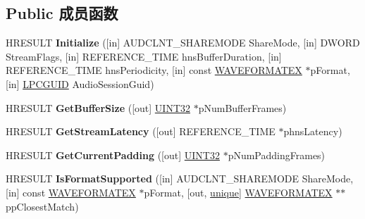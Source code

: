 \subsection*{Public 成员函数}
\begin{DoxyCompactItemize}
\item 
\mbox{\label{interface_i_audio_client_afee0701a49a99e43259a7661e1c5ed38}} 
H\+R\+E\+S\+U\+LT {\bfseries Initialize} (\mbox{[}in\mbox{]} A\+U\+D\+C\+L\+N\+T\+\_\+\+S\+H\+A\+R\+E\+M\+O\+DE Share\+Mode, \mbox{[}in\mbox{]} D\+W\+O\+RD Stream\+Flags, \mbox{[}in\mbox{]} R\+E\+F\+E\+R\+E\+N\+C\+E\+\_\+\+T\+I\+ME hns\+Buffer\+Duration, \mbox{[}in\mbox{]} R\+E\+F\+E\+R\+E\+N\+C\+E\+\_\+\+T\+I\+ME hns\+Periodicity, \mbox{[}in\mbox{]} const \hyperlink{struct_w_a_v_e_f_o_r_m_a_t_e_x}{W\+A\+V\+E\+F\+O\+R\+M\+A\+T\+EX} $\ast$p\+Format, \mbox{[}in\mbox{]} \hyperlink{interface_g_u_i_d}{L\+P\+C\+G\+U\+ID} Audio\+Session\+Guid)
\item 
\mbox{\label{interface_i_audio_client_a4e9563d4426770670c29fceba13abcea}} 
H\+R\+E\+S\+U\+LT {\bfseries Get\+Buffer\+Size} (\mbox{[}out\mbox{]} \hyperlink{_processor_bind_8h_ae1e6edbbc26d6fbc71a90190d0266018}{U\+I\+N\+T32} $\ast$p\+Num\+Buffer\+Frames)
\item 
\mbox{\label{interface_i_audio_client_a3cd4db025d640b7bc41a362745fb60c2}} 
H\+R\+E\+S\+U\+LT {\bfseries Get\+Stream\+Latency} (\mbox{[}out\mbox{]} R\+E\+F\+E\+R\+E\+N\+C\+E\+\_\+\+T\+I\+ME $\ast$phns\+Latency)
\item 
\mbox{\label{interface_i_audio_client_a130df1eee9f244b76875921bd802fa43}} 
H\+R\+E\+S\+U\+LT {\bfseries Get\+Current\+Padding} (\mbox{[}out\mbox{]} \hyperlink{_processor_bind_8h_ae1e6edbbc26d6fbc71a90190d0266018}{U\+I\+N\+T32} $\ast$p\+Num\+Padding\+Frames)
\item 
\mbox{\label{interface_i_audio_client_a0aa1c8f272a6e624abe0925739f3f287}} 
H\+R\+E\+S\+U\+LT {\bfseries Is\+Format\+Supported} (\mbox{[}in\mbox{]} A\+U\+D\+C\+L\+N\+T\+\_\+\+S\+H\+A\+R\+E\+M\+O\+DE Share\+Mode, \mbox{[}in\mbox{]} const \hyperlink{struct_w_a_v_e_f_o_r_m_a_t_e_x}{W\+A\+V\+E\+F\+O\+R\+M\+A\+T\+EX} $\ast$p\+Format, \mbox{[}out, \hyperlink{interfaceunique}{unique}\mbox{]} \hyperlink{struct_w_a_v_e_f_o_r_m_a_t_e_x}{W\+A\+V\+E\+F\+O\+R\+M\+A\+T\+EX} $\ast$$\ast$pp\+Closest\+Match)
$$
\end{DoxyCompactItemize}

